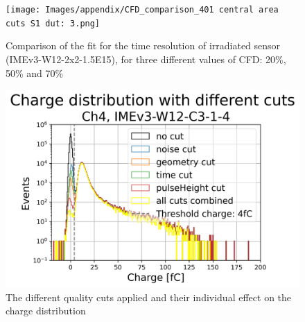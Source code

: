\begin{figure}[h!tbp]
    \centering
    \texttt{[image: Images/appendix/CFD\_comparison\_401 central area cuts S1 dut: 3.png]}
    \caption{Comparison of the fit for the time resolution of irradiated sensor (IMEv3-W12-2x2-1.5E15), for three different values of CFD: 20\%, 50\% and 70\%}
    \label{fig:CFD_comparison_irradiated}
\end{figure}

\begin{figure}[h!tbp]
    \centering
    \includegraphics[width=0.7\linewidth]{Images/appendix/Charge_distribution_different_cuts_batch_401_S1_DUTs_3.png}
    \caption{The different quality cuts applied and their individual effect on the charge distribution}
    \label{fig:charge_plot_all_cuts}
\end{figure}



